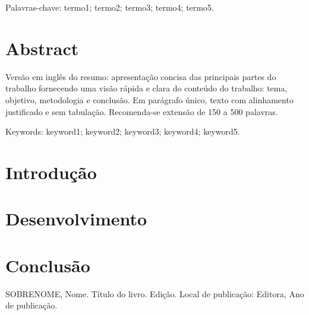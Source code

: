\documentclass[a4paper,12pt]{report}
\begin{document}
Palavras-chave: termo1; termo2; termo3; termo4; termo5.

\chapter*{Abstract}
Versão em inglês do resumo: apresentação concisa das principais partes do trabalho fornecendo uma visão rápida e clara do conteúdo do trabalho: tema, objetivo, metodologia e conclusão. Em parágrafo único, texto com alinhamento justificado e sem tabulação. Recomenda-se extensão de 150 a 500 palavras.

Keywords: keyword1; keyword2; keyword3; keyword4; keyword5.

\tableofcontents

\chapter{Introdução}

\chapter{Desenvolvimento}

\chapter{Conclusão}

\begin{thebibliography}{99}
     SOBRENOME, Nome. Título do livro. Edição. Local de publicação: Editora, Ano de publicação.
\end{thebibliography}
\end{document}

